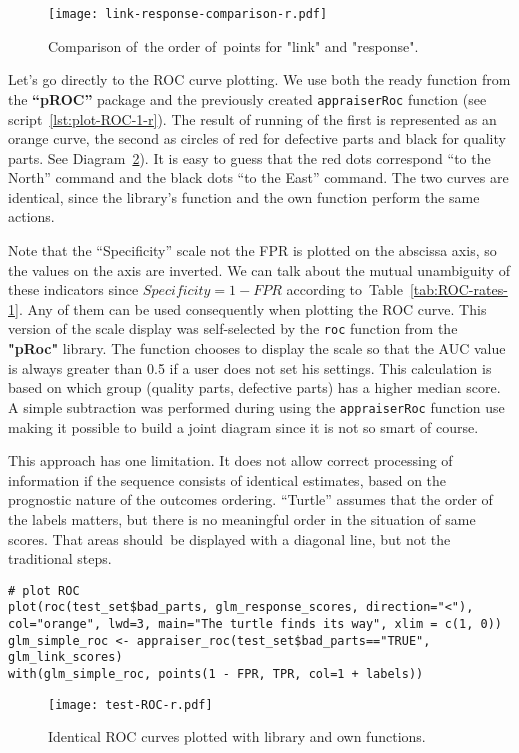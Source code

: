 \documentclass[]{scrreprt}
\begin{document}
%
\begin{figure}[htp]
	\centering
	\texttt{[image: link-response-comparison-r.pdf]}
	\caption{Comparison of~the order of~points for "link" and "response".}
	\label{fig:link-response-comparison-r}
\end{figure}
%

Let's go directly to the ROC curve plotting. We use both the ready function from the \textbf{``pROC''} package and the previously created \texttt{appraiserRoc} function (see script~\ref{lst:plot-ROC-1-r}). The result of running of the first is represented as an orange curve, the second as circles of red for defective parts and black for quality parts. See Diagram~\ref{fig:test-ROC-r}). It is easy to guess that the red dots correspond ``to the North'' command and the black dots ``to the East'' command. The two curves are identical, since the library's function and the own function perform the same actions.

Note that the ``Specificity'' scale not the FPR is plotted on the abscissa axis, so the values on the axis are inverted. We can talk about the mutual unambiguity of these indicators since $Specificity = 1 - FPR$ according to~Table~\ref{tab:ROC-rates-1}. Any of them can be used consequently when plotting the ROC curve. This version of the scale display was self-selected by the \texttt{roc} function from the \textbf{"pRoc"} library. The function chooses to display the scale so that the AUC value is always greater than 0.5 if a user does not set his settings. This calculation is based on which group (quality parts, defective parts) has a higher median score. A simple subtraction was performed during using the \texttt{appraiserRoc} function use making it possible to build a joint diagram since it is not so smart of course.

This approach has one limitation.  It does not allow correct processing of information if the sequence consists of identical estimates, based on the prognostic nature of the outcomes ordering. ``Turtle'' assumes that the order of the labels matters, but there is no meaningful order in the situation of same scores. That areas should~be displayed with a diagonal line, but not the traditional steps.
%
\begin{lstlisting}[float=htp, caption = Plotting the ROC curve using library and own functions, firstnumber=1, label= lst:plot-ROC-1-r]
# plot ROC
plot(roc(test_set$bad_parts, glm_response_scores, direction="<"),
col="orange", lwd=3, main="The turtle finds its way", xlim = c(1, 0))
glm_simple_roc <- appraiser_roc(test_set$bad_parts=="TRUE", glm_link_scores)
with(glm_simple_roc, points(1 - FPR, TPR, col=1 + labels))
\end{lstlisting}
%
\begin{figure}[htp]
	\centering
	\texttt{[image: test-ROC-r.pdf]}
	\caption{Identical ROC curves plotted with library and own functions.}
	\label{fig:test-ROC-r}
\end{figure}
%
\end{document}
